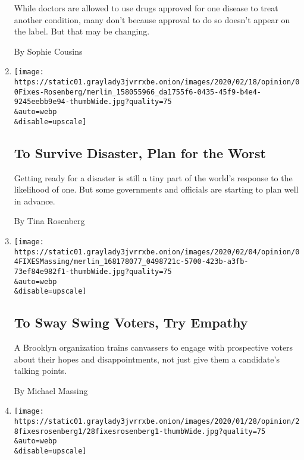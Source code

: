 \begin{enumerate}
  While doctors are allowed to use drugs approved for one disease to
  treat another condition, many don't because approval to do so doesn't
  appear on the label. But that may be changing.

  By Sophie Cousins
\item
  \href{/2020/02/19/opinion/survive-disaster-plan-for-worst.html}{}

  \texttt{[image: https://static01.graylady3jvrrxbe.onion/images/2020/02/18/opinion/00Fixes-Rosenberg/merlin\_158055966\_da1755f6-0435-45f9-b4e4-9245eebb9e94-thumbWide.jpg?quality=75\\\&auto=webp\\\&disable=upscale]}

  \hypertarget{to-survive-disaster-plan-for-the-worst}{%
  \subsection{To Survive Disaster, Plan for the
  Worst}\label{to-survive-disaster-plan-for-the-worst}}

  Getting ready for a disaster is still a tiny part of the world's
  response to the likelihood of one. But some governments and officials
  are starting to plan well in advance.

  By Tina Rosenberg
\item
  \href{/2020/02/04/opinion/election-2020.html}{}

  \texttt{[image: https://static01.graylady3jvrrxbe.onion/images/2020/02/04/opinion/04FIXESMassing/merlin\_168178077\_0498721c-5700-423b-a3fb-73ef84e982f1-thumbWide.jpg?quality=75\\\&auto=webp\\\&disable=upscale]}

  \hypertarget{to-sway-swing-voters-try-empathy}{%
  \subsection{To Sway Swing Voters, Try
  Empathy}\label{to-sway-swing-voters-try-empathy}}

  A Brooklyn organization trains canvassers to engage with prospective
  voters about their hopes and disappointments, not just give them a
  candidate's talking points.

  By Michael Massing
\item
  \href{/2020/01/28/opinion/opioid-drug-prevention-ads.html}{}

  \texttt{[image: https://static01.graylady3jvrrxbe.onion/images/2020/01/28/opinion/28fixesrosenberg1/28fixesrosenberg1-thumbWide.jpg?quality=75\\\&auto=webp\\\&disable=upscale]}

  \hypertarget{weaponizing-truth-against-opioids}{%
}
\end{enumerate}
